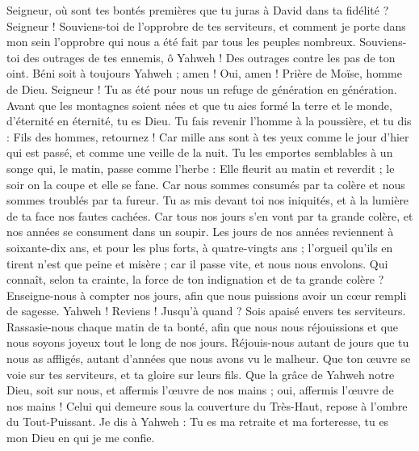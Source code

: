 \begin{multicols}{2}
Seigneur, où sont tes bontés premières que tu juras à David dans ta fidélité ?
Seigneur ! Souviens-toi de l'opprobre de tes serviteurs, et comment je porte dans mon sein l'opprobre qui nous a été fait par tous les peuples nombreux.
Souviens-toi des outrages de tes ennemis, ô Yahweh ! Des outrages contre les pas de ton oint.
Béni soit à toujours Yahweh ; amen ! Oui, amen !
\VerseOne{}Prière de Moïse, homme de Dieu. Seigneur ! Tu as été pour nous un refuge de génération en génération.
Avant que les montagnes soient nées et que tu aies formé la terre et le monde, d’éternité en éternité, tu es Dieu.
Tu fais revenir l'homme à la poussière, et tu dis : Fils des hommes, retournez !
Car mille ans sont à tes yeux comme le jour d'hier qui est passé, et comme une veille de la nuit.
Tu les emportes semblables à un songe qui, le matin, passe comme l’herbe :
Elle fleurit au matin et reverdit ; le soir on la coupe et elle se fane.
Car nous sommes consumés par ta colère et nous sommes troublés par ta fureur.
Tu as mis devant toi nos iniquités, et à la lumière de ta face nos fautes cachées.
Car tous nos jours s'en vont par ta grande colère, et nos années se consument dans un soupir.
Les jours de nos années reviennent à soixante-dix ans, et pour les plus forts, à quatre-vingts ans ; l’orgueil qu’ils en tirent n’est que peine et misère ; car il passe vite, et nous nous envolons.
Qui connaît, selon ta crainte, la force de ton indignation et de ta grande colère ?
Enseigne-nous à compter nos jours, afin que nous puissions avoir un cœur rempli de sagesse.
Yahweh ! Reviens ! Jusqu’à quand ? Sois apaisé envers tes serviteurs.
Rassasie-nous chaque matin de ta bonté, afin que nous nous réjouissions et que nous soyons joyeux tout le long de nos jours.
Réjouis-nous autant de jours que tu nous as affligés, autant d’années que nous avons vu le malheur.
Que ton œuvre se voie sur tes serviteurs, et ta gloire sur leurs fils.
Que la grâce de Yahweh notre Dieu, soit sur nous, et affermis l'œuvre de nos mains ; oui, affermis l'œuvre de nos mains !
\VerseOne{}Celui qui demeure sous la couverture du Très-Haut, repose à l'ombre du Tout-Puissant.
Je dis à Yahweh : Tu es ma retraite et ma forteresse, tu es mon Dieu en qui je me confie.

\end{multicols}

